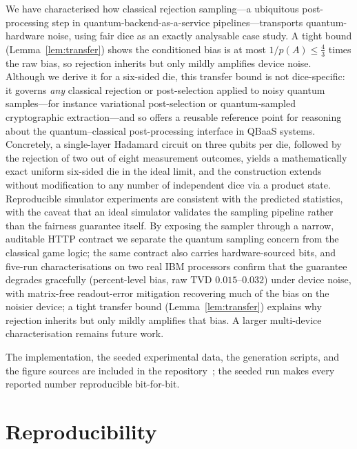 \documentclass{ieeeaccess}
\begin{document}
We have characterised how classical rejection sampling---a ubiquitous post-processing step in quantum-backend-as-a-service pipelines---transports quantum-hardware noise, using fair dice as an exactly analysable case study. A tight bound (Lemma~\ref{lem:transfer}) shows the conditioned bias is at most $1/p(A)\le\tfrac43$ times the raw bias, so rejection inherits but only mildly amplifies device noise. Although we derive it for a six-sided die, this transfer bound is not dice-specific: it governs \emph{any} classical rejection or post-selection applied to noisy quantum samples---for instance variational post-selection or quantum-sampled cryptographic extraction---and so offers a reusable reference point for reasoning about the quantum--classical post-processing interface in QBaaS systems. Concretely, a single-layer Hadamard circuit on three qubits per die, followed by the rejection of two out of eight measurement outcomes, yields a mathematically exact uniform six-sided die in the ideal limit, and the construction extends without modification to any number of independent dice via a product state. Reproducible simulator experiments are consistent with the predicted statistics, with the caveat that an ideal simulator validates the sampling pipeline rather than the fairness guarantee itself. By exposing the sampler through a narrow, auditable HTTP contract we separate the quantum sampling concern from the classical game logic; the same contract also carries hardware-sourced bits, and five-run characterisations on two real IBM processors confirm that the guarantee degrades gracefully (percent-level bias, raw $\mathrm{TVD}$ $0.015$--$0.032$) under device noise, with matrix-free readout-error mitigation recovering much of the bias on the noisier device; a tight transfer bound (Lemma~\ref{lem:transfer}) explains why rejection inherits but only mildly amplifies that bias. A larger multi-device characterisation remains future work.

The implementation, the seeded experimental data, the generation scripts, and the figure sources are included in the repository~\cite{projectrepo}; the seeded run makes every reported number reproducible bit-for-bit.

\section*{Reproducibility}
\end{document}
